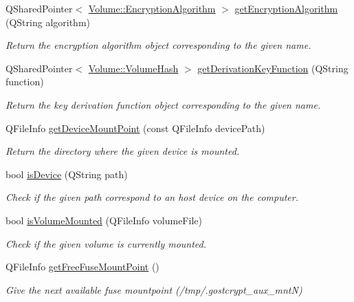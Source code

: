 \begin{DoxyCompactItemize}
Q\+Shared\+Pointer$<$ \hyperlink{class_gost_crypt_1_1_volume_1_1_encryption_algorithm}{Volume\+::\+Encryption\+Algorithm} $>$ \hyperlink{class_gost_crypt_1_1_core_1_1_core_base_a306718b124fedfb427a840dd6718514e}{get\+Encryption\+Algorithm} (Q\+String algorithm)
\begin{DoxyCompactList}\small\item\em Return the encryption algorithm object corresponding to the given name. \end{DoxyCompactList}\item 
Q\+Shared\+Pointer$<$ \hyperlink{class_gost_crypt_1_1_volume_1_1_volume_hash}{Volume\+::\+Volume\+Hash} $>$ \hyperlink{class_gost_crypt_1_1_core_1_1_core_base_af5bf7852935d5ab56ae8bbdd581f589a}{get\+Derivation\+Key\+Function} (Q\+String function)
\begin{DoxyCompactList}\small\item\em Return the key derivation function object corresponding to the given name. \end{DoxyCompactList}\item 
Q\+File\+Info \hyperlink{class_gost_crypt_1_1_core_1_1_core_base_a1b3c979c1f14e087d8bce55f70fb5320}{get\+Device\+Mount\+Point} (const Q\+File\+Info device\+Path)
\begin{DoxyCompactList}\small\item\em Return the directory where the given device is mounted. \end{DoxyCompactList}\item 
bool \hyperlink{class_gost_crypt_1_1_core_1_1_core_base_a9719fc843a6858f8f4f44f3a9eb60605}{is\+Device} (Q\+String path)
\begin{DoxyCompactList}\small\item\em Check if the given path correspond to an host device on the computer. \end{DoxyCompactList}\item 
bool \hyperlink{class_gost_crypt_1_1_core_1_1_core_base_a25b5689e9d93d04e6d1474a4415a92c1}{is\+Volume\+Mounted} (Q\+File\+Info volume\+File)
\begin{DoxyCompactList}\small\item\em Check if the given volume is currently mounted. \end{DoxyCompactList}\item 
Q\+File\+Info \hyperlink{class_gost_crypt_1_1_core_1_1_core_base_a80db2edf1a03b67ae06f3845156e5b77}{get\+Free\+Fuse\+Mount\+Point} ()
\begin{DoxyCompactList}\small\item\em Give the next available fuse mountpoint (/tmp/.gostcrypt\+\_\+aux\+\_\+mntN) \end{DoxyCompactList}\item 

\end{DoxyCompactItemize}

